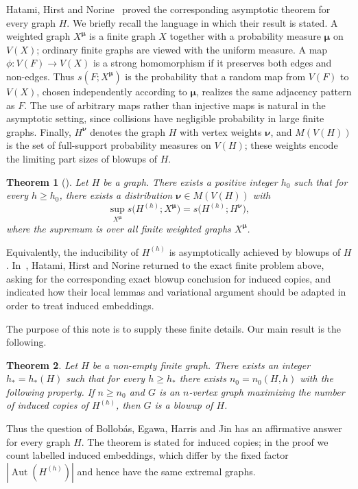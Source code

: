 \documentclass[10pt]{article}
\theoremstyle{plain}
\newtheorem{theorem}{Theorem}[section]
\theoremstyle{remark}
\DeclareMathOperator{\Aut}{Aut}
\newcommand{\bmu}{{\boldsymbol{\mu}}}
\newcommand{\bnu}{{\boldsymbol{\nu}}}
\begin{document}
Hatami, Hirst and Norine~\cite{HatamiHirstNorine} proved the corresponding asymptotic theorem for every graph $H$. We briefly recall the language in which their result is stated. A weighted graph $X^\bmu$ is a finite graph $X$ together with a probability measure $\bmu$ on $V(X)$; ordinary finite graphs are viewed with the uniform measure. A map $\phi:V(F)\to V(X)$ is a strong homomorphism if it preserves both edges and non-edges. Thus $s(F;X^\bmu)$ is the probability that a random map from $V(F)$ to $V(X)$, chosen independently according to $\bmu$, realizes the same adjacency pattern as $F$. The use of arbitrary maps rather than injective maps is natural in the asymptotic setting, since collisions have negligible probability in large finite graphs. Finally, $H^\bnu$ denotes the graph $H$ with vertex weights $\bnu$, and $M(V(H))$ is the set of full-support probability measures on $V(H)$; these weights encode the limiting part sizes of blowups of $H$.
\begin{theorem}[\cite{HatamiHirstNorine}]
Let $H$ be a graph. There exists a positive integer $h_0$ such that for every $h\ge h_0$, there exists a distribution $\bnu\in M(V(H))$ with
\[
        \sup_{X^\bmu} s\bigl(H^{(h)};X^\bmu\bigr)
        = s\bigl(H^{(h)};H^\bnu\bigr),
\]
where the supremum is over all finite weighted graphs $X^\bmu$.
\end{theorem}
Equivalently, the inducibility of $H^{(h)}$ is asymptotically achieved by blowups of $H$. In~\cite[Question~7.1]{HatamiHirstNorine}, Hatami, Hirst and Norine returned to the exact finite problem above, asking for the corresponding exact blowup conclusion for induced copies, and indicated how their local lemmas and variational argument should be adapted in order to treat induced embeddings.

The purpose of this note is to supply these finite details. Our main result is the following.

\begin{theorem}
\label{thm:main}
Let $H$ be a non-empty finite graph. There exists an integer $h_*=h_*(H)$ such that for every $h\ge h_*$ there exists $n_0=n_0(H,h)$ with the following property. If $n\ge n_0$ and $G$ is an $n$-vertex graph maximizing the number of induced copies of $H^{(h)}$, then $G$ is a blowup of $H$.
\end{theorem}

Thus the question of Bollob\'as, Egawa, Harris and Jin has an affirmative answer for every graph $H$. The theorem is stated for induced copies; in the proof we count labelled induced embeddings, which differ by the fixed factor $|\Aut(H^{(h)})|$ and hence have the same extremal graphs.
\end{document}
